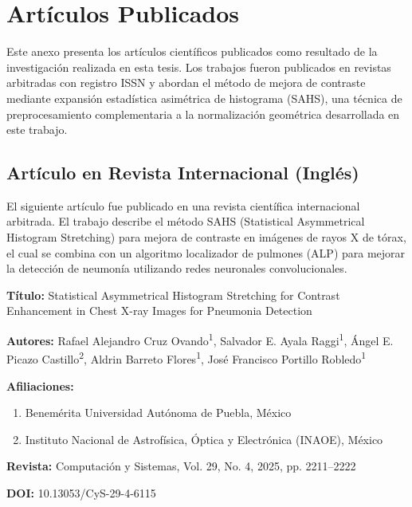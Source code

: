 \chapter{Artículos Publicados}
\label{anexo:articulos_publicados}

Este anexo presenta los artículos científicos publicados como resultado de la investigación realizada en esta tesis. Los trabajos fueron publicados en revistas arbitradas con registro ISSN y abordan el método de mejora de contraste mediante expansión estadística asimétrica de histograma (SAHS), una técnica de preprocesamiento complementaria a la normalización geométrica desarrollada en este trabajo.

\section{Artículo en Revista Internacional (Inglés)}

El siguiente artículo fue publicado en una revista científica internacional arbitrada. El trabajo describe el método SAHS (Statistical Asymmetrical Histogram Stretching) para mejora de contraste en imágenes de rayos X de tórax, el cual se combina con un algoritmo localizador de pulmones (ALP) para mejorar la detección de neumonía utilizando redes neuronales convolucionales.

\textbf{Título:} Statistical Asymmetrical Histogram Stretching for Contrast Enhancement in Chest X-ray Images for Pneumonia Detection

\textbf{Autores:} Rafael Alejandro Cruz Ovando\textsuperscript{1}, Salvador E. Ayala Raggi\textsuperscript{1}, Ángel E. Picazo Castillo\textsuperscript{2}, Aldrin Barreto Flores\textsuperscript{1}, José Francisco Portillo Robledo\textsuperscript{1}

\textbf{Afiliaciones:}
\begin{enumerate}
\item Benemérita Universidad Autónoma de Puebla, México
\item Instituto Nacional de Astrofísica, Óptica y Electrónica (INAOE), México
\end{enumerate}

\textbf{Revista:} Computación y Sistemas, Vol. 29, No. 4, 2025, pp. 2211–2222

\textbf{DOI:} 10.13053/CyS-29-4-6115

